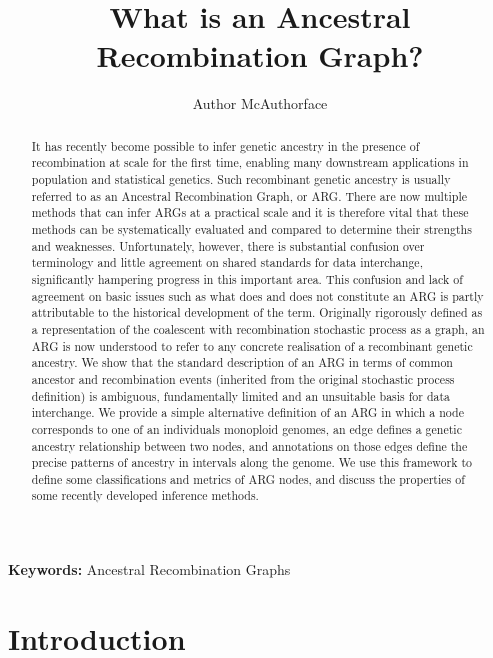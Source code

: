 \documentclass{article}
\begin{document}
\linenumbers
\title{What is an Ancestral Recombination Graph?}
\author{Author McAuthorface}

\maketitle

\begin{abstract}
It has recently become possible to infer genetic ancestry in the presence of
recombination at scale for the first time, enabling many
downstream applications in population and statistical genetics.
Such recombinant genetic ancestry is usually
referred to as an Ancestral Recombination Graph, or ARG.
There are now multiple methods that can infer ARGs at a practical scale
and it is therefore vital that these methods can be systematically evaluated
and compared to determine their strengths and weaknesses.
Unfortunately, however, there is substantial confusion over
terminology and little agreement on shared standards for data interchange,
significantly hampering progress in this important area.
This confusion and lack of agreement on basic issues such as what does and
does not constitute an ARG is partly attributable to the historical
development of the term.
Originally rigorously defined as
a representation of the coalescent with recombination
stochastic process as a graph, an ARG is now understood to refer to any
concrete realisation of a recombinant genetic ancestry.
We show that the standard description of an ARG
in terms of common ancestor and recombination events
(inherited from the original stochastic process definition) is
ambiguous, fundamentally limited and an unsuitable basis for data interchange.
We provide a simple alternative definition of an ARG in which a node
corresponds to one of an individuals monoploid genomes, an edge
defines a genetic ancestry relationship between two nodes,
and annotations on those edges define the precise patterns of
ancestry in intervals along the genome.
We use this framework to define some classifications and metrics of ARG nodes,
and discuss the properties of some recently developed inference methods.
\end{abstract}

\textbf{Keywords:} Ancestral Recombination Graphs

\section*{Introduction}
\end{document}
